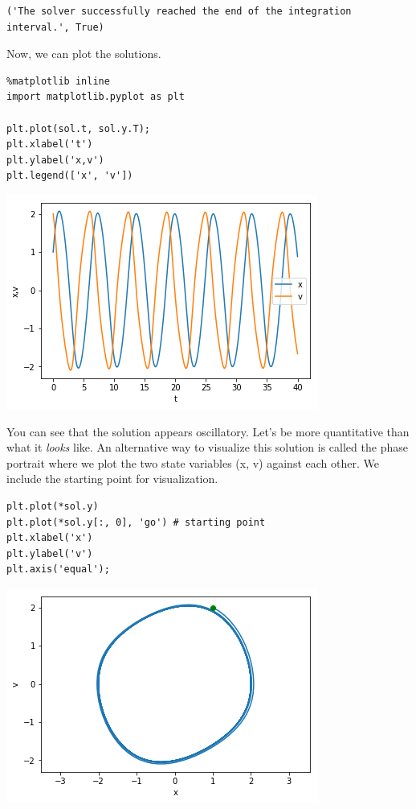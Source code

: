 \documentclass[11pt]{article}
\begin{document}
\begin{verbatim}
('The solver successfully reached the end of the integration interval.', True)
\end{verbatim}

Now, we can plot the solutions.

\begin{verbatim}
%matplotlib inline
import matplotlib.pyplot as plt

plt.plot(sol.t, sol.y.T);
plt.xlabel('t')
plt.ylabel('x,v')
plt.legend(['x', 'v'])
\end{verbatim}

\begin{center}
\includegraphics[width=.9\linewidth]{obipy-resources/c515c00ecd6370edf5b32608ff70731e-388473FS.png}
\end{center}

You can see that the solution appears oscillatory. Let's be more quantitative than what it \emph{looks} like. An alternative way to visualize this solution is called the phase portrait where we plot the two state variables (x, v) against each other. We include the starting point for visualization.

\begin{verbatim}
plt.plot(*sol.y)
plt.plot(*sol.y[:, 0], 'go') # starting point
plt.xlabel('x')
plt.ylabel('v')
plt.axis('equal');
\end{verbatim}

\begin{center}
\includegraphics[width=.9\linewidth]{obipy-resources/c515c00ecd6370edf5b32608ff70731e-38847p6E.png}
\end{center}
\end{document}
